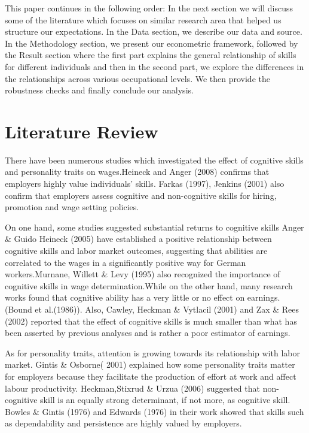 \documentclass[11pt, a4paper, leqno]{article}
\begin{document}
This paper continues in the following order: In the next section we will discuss some of the literature which focuses on similar research area that helped us structure our expectations. In the Data section, we describe our data and source. In the Methodology section, we present our econometric framework, followed by the Result section where the first part explains the general relationship of skills for different individuals and then in the second part, we explore the differences in the relationships across various occupational levels. We then provide the robustness checks and finally conclude our analysis.

\section*{Literature Review}

There have been numerous studies which investigated the effect of cognitive skills and personality traits on wages.Heineck and Anger (2008) confirms that employers highly value individuals’ skills. Farkas (1997), Jenkins (2001) also confirm that employers assess cognitive and non-cognitive skills for hiring, promotion and wage setting policies.\par

On one hand, some studies suggested substantial returns to cognitive skills Anger \& Guido Heineck (2005) have established a positive relationship between cognitive skills and labor market outcomes, suggesting that abilities are correlated to the
wages in a significantly positive way for German workers.Murnane, Willett \& Levy (1995) also recognized the importance of cognitive skills in wage determination.While on the other hand, many research works found that cognitive ability has a very little  or no effect on earnings.(Bound et al.(1986)). Also, Cawley, Heckman \& Vytlacil (2001) and  Zax \& Rees (2002) reported that the effect of cognitive skills is much smaller than what has been asserted by previous analyses and is rather a poor estimator of earnings.\par

As for personality traits, attention is growing towards its relationship with labor market. Gintis \& Osborne( 2001) explained how some personality traits matter for employers because they facilitate the production of effort at work and affect labour productivity. 
Heckman,Stixrud \& Urzua (2006) suggested that non-cognitive skill is an equally strong determinant, if not more, as cognitive skill. Bowles \& Gintis (1976) and Edwards (1976) in their work showed that skills such as dependability and persistence are highly valued by employers.\par
\end{document}
